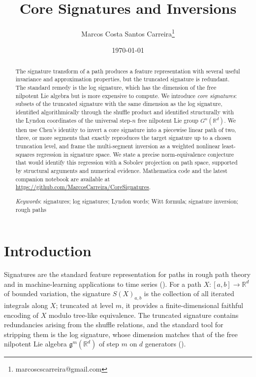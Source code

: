 \documentclass[12pt,english]{article}
\theoremstyle{remark}
\begin{document}
\title{Core Signatures and Inversions}
\author{Marcos Costa Santos Carreira\thanks{marcoscscarreira@gmail.com}}
\date{\today}
\maketitle

\begin{abstract}
The signature transform of a path produces a feature representation
with several useful invariance and approximation properties, but the
truncated signature is redundant. The standard remedy is the log signature,
which has the dimension of the free nilpotent Lie algebra but is more
expensive to compute. We introduce \emph{core signatures}: subsets
of the truncated signature with the same dimension as the log signature,
identified algorithmically through the shuffle product and identified
structurally with the Lyndon coordinates of the universal step-$n$
free nilpotent Lie group $G^{n}(\mathbb{R}^{d})$. We then use Chen's
identity to invert a core signature into a piecewise linear path of
two, three, or more segments that exactly reproduces the target signature
up to a chosen truncation level, and frame the multi-segment inversion
as a weighted nonlinear least-squares regression in signature space.
We state a precise norm-equivalence conjecture that would identify
this regression with a Sobolev projection on path space, supported
by structural arguments and numerical evidence. Mathematica code and
the latest companion notebook are available at \url{https://github.com/MarcosCarreira/CoreSignatures}.

\medskip{}
\textit{Keywords}: signatures; log signatures; Lyndon words; Witt
formula; signature inversion; rough paths

\pagebreak{}
\end{abstract}

\section{Introduction}

Signatures are the standard feature representation for paths in rough
path theory and in machine-learning applications to time series (\cite{Lyons,Primer,Fermanian_Thesis}).
For a path $X:[a,b]\to\mathbb{R}^{d}$ of bounded variation, the signature
$S(X)_{a,b}$ is the collection of all iterated integrals along $X$;
truncated at level $m$, it provides a finite-dimensional faithful
encoding of $X$ modulo tree-like equivalence. The truncated signature
contains redundancies arising from the shuffle relations, and the
standard tool for stripping them is the log signature, whose dimension
matches that of the free nilpotent Lie algebra $\mathfrak{g}^{m}(\mathbb{R}^{d})$
of step $m$ on $d$ generators (\cite{log signatures,iisignature CRISM,iisignature,iisignature 1004}).
\end{document}
